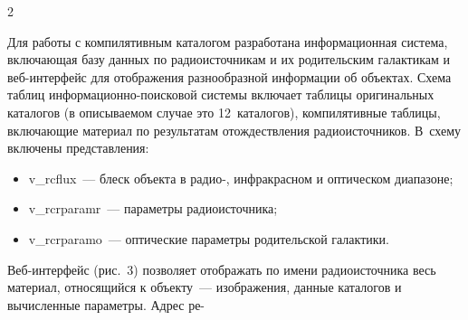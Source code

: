 \begin{multicols}{2}
      
      Для работы с компилятивным каталогом разработана информационная система, 
включающая базу данных по радиоисточникам и их родительским галактикам и 
      веб-ин\-тер\-фейс для отображения разнообразной информации об объектах. Схема 
таб\-лиц ин\-фор\-ма\-ци\-он\-но-по\-иско\-вой сис\-те\-мы включает таблицы оригинальных 
каталогов (в опи\-сы\-ва\-емом случае это 12~каталогов), компилятивные таб\-ли\-цы, вклю\-ча\-ющие 
материал по результатам отож\-де\-ст\-вле\-ния радиоисточников. В~схему включены 
представления: 
      \begin{itemize}
\item v\_rcflux~--- блеск объекта в радио-, инфракрасном и оптическом диапазоне; 
\item v\_rcrparamr~--- параметры радиоисточника; 
\item v\_rcrparamo~--- оптические параметры родительской галактики.
\end{itemize}



Веб-ин\-тер\-фейс (рис.~3) позволяет отображать по имени радиоисточника весь материал, 
относящийся к объекту~--- изображения, данные каталогов и вычисленные па\-ра\-мет\-ры. 
Адрес ре-\linebreak\vspace*{-12pt}

\pagebreak

\end{multicols}

\begin{figure} %
\vspace*{1pt}
 \begin{center}
 \mbox{%
 \epsfxsize=161.754mm
 }
 \end{center}
 \vspace*{-9pt}
\vspace*{6pt}
\end{figure}

